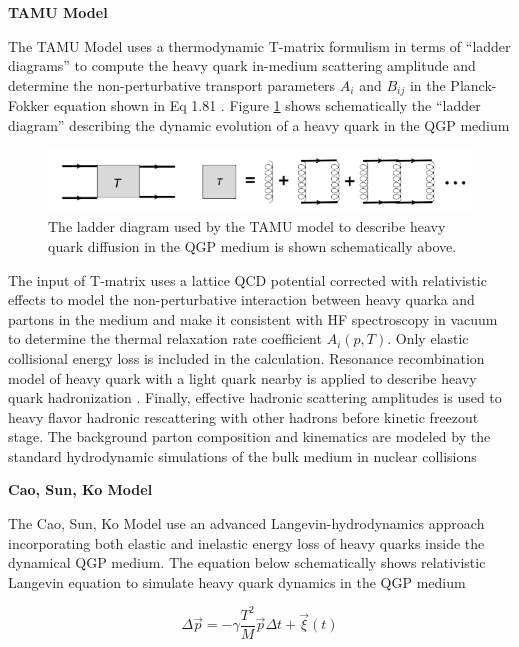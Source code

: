 \textbf{TAMU Model}

The TAMU Model uses a thermodynamic T-matrix formulism in terms of ``ladder diagrams'' to compute the heavy quark in-medium scattering amplitude and determine the non-perturbative transport parameters $A_i$ and $B_{ij}$ in the Planck-Fokker equation shown in Eq 1.81 \cite{TAMUModel}. Figure \ref{LadderDiagram} shows schematically the ``ladder diagram'' describing the dynamic evolution of a heavy quark in the QGP medium 

 \begin{figure}[hbtp]
\begin{center}
\includegraphics[width=1.0\textwidth]{Figures/Chapter1/LadderDiagram.png}
\caption{The ladder diagram used by the TAMU model to describe heavy quark diffusion in the QGP medium is shown schematically above.}
\label{LadderDiagram}
\end{center}
\end{figure}  

The input of T-matrix uses a lattice QCD potential \cite{LQCDTAMU} corrected with relativistic effects to model the non-perturbative interaction between heavy quarka and partons in the medium and make it consistent with HF spectroscopy in vacuum to determine the thermal relaxation rate coefficient $A_i(p,T)$. Only elastic collisional energy loss is included in the calculation. Resonance recombination model of heavy quark with a light quark nearby is applied to describe heavy quark hadronization \cite{RRM1}. Finally, effective hadronic scattering amplitudes is used to heavy flavor hadronic rescattering with other hadrons before kinetic freezout stage. The background parton composition and kinematics are modeled by the standard hydrodynamic simulations of the bulk medium in nuclear collisions

\textbf{Cao, Sun, Ko Model}

The Cao, Sun, Ko Model use an advanced Langevin-hydrodynamics approach \cite{CaoLH1,CaoLH2} incorporating both elastic and inelastic energy loss of heavy quarks inside the dynamical QGP medium. The equation below schematically shows relativistic Langevin equation to simulate heavy quark dynamics in the QGP medium


\begin{equation}
\Delta \vec{p} = - \gamma \frac{T^2}{M} \vec{p} \Delta t + \vec{\xi}(t) 
\end{equation}

